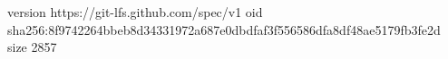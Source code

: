 version https://git-lfs.github.com/spec/v1
oid sha256:8f9742264bbeb8d34331972a687e0dbdfaf3f556586dfa8df48ae5179fb3fe2d
size 2857
